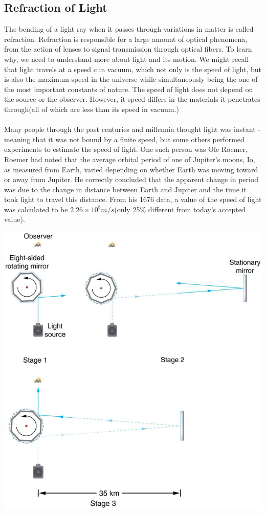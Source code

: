 \documentclass[11pt]{article}
\begin{document}
	\subsection*{Refraction of Light}
	The bending of a light ray when it passes through variations in matter is called refraction. Refraction is responsible for a large amount of optical phenomena, from the action of lenses to signal transmission through optical fibers. To learn why, we need to understand more about light and its motion. We might recall that light travels at a speed $c$ in vacuum, which not only is the speed of light, but is also the maximum speed in the universe while simultaneously being the one of the most important constants of nature. The speed of light does not depend on the source or the observer. However, it speed differs in the materials it penetrates through(all of which are less than its speed in vacuum.) \\ \\
	Many people through the past centuries and millennia thought light was instant - meaning that it was not bound by a finite speed, but some others performed experiments to estimate the speed of light. One such person was Ole Roemer, Roemer had noted that the average orbital period of one of Jupiter’s moons, Io, as measured from Earth, varied depending on whether Earth was moving toward or away from Jupiter. He correctly concluded that the apparent change in period was due to the change in distance between Earth and Jupiter and the time it took light to travel this distance. From his 1676 data, a value of the speed of light was calculated to be  $2.26×10^8m/s$(only 25\% different from today’s accepted value).
	\begin{center}
		\includegraphics[scale=0.4]{michelson}
	\end{center}
\end{document}

